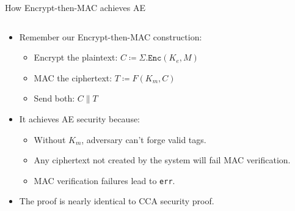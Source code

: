\documentclass[aspectratio=169, lualatex, handout]{beamer}
\begin{document}
\begin{frame}{How Encrypt-then-MAC achieves AE}
	\begin{columns}[c]
		\begin{column}{0.6\textwidth}
			\begin{itemize}
				\item Remember our Encrypt-then-MAC construction:
				      \begin{itemize}
					      \item Encrypt the plaintext: $C \coloneq \Sigma.\texttt{Enc}(K_e, M)$
					      \item MAC the ciphertext: $T \coloneq F(K_m, C)$
					      \item Send both: $C\|T$
				      \end{itemize}
				\item It achieves AE security because:
				      \begin{itemize}
					      \item Without $K_m$, adversary can't forge valid tags.
					      \item Any ciphertext not created by the system will fail MAC verification.
					      \item MAC verification failures lead to \texttt{err}.
				      \end{itemize}
				\item The proof is nearly identical to CCA security proof.
			\end{itemize}
		\end{column}
		\begin{column}{0.4\textwidth}
			\vspace{0.5em}
		\end{column}
	\end{columns}
\end{frame}
\end{document}
